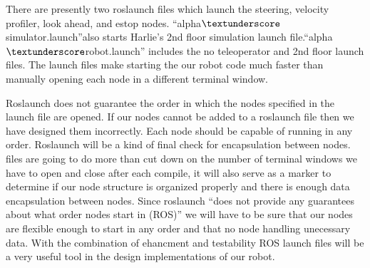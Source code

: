 There are presently two roslaunch files which launch the steering, velocity profiler, look ahead, and estop nodes. ``alpha$\textunderscore$simulator.launch''also starts Harlie's 2nd floor simulation launch file.``alpha$\textunderscore$robot.launch'' includes the no teleoperator and 2nd floor launch files. The launch files make starting the our robot code much faster than manually opening each node in a different terminal window.

Roslaunch does not guarantee the order in which the nodes specified in the launch file are opened.\cite{_roslaunch/architecture}  If our nodes cannot be added to a roslaunch file then we have designed them incorrectly. Each node should be capable of running in any order.  Roslaunch will be a kind of final check for encapsulation between nodes.  files are going to do more than cut down on the number of terminal windows we have to open and close after each compile, it will also serve as a marker to determine if our node structure is organized properly and there is enough data encapsulation between nodes. Since roslaunch ``does not provide any guarantees about what order nodes start in (ROS)'' we will have to be sure that our nodes are flexible enough to start in any order and that no node handling unecessary data. With the combination of ehancment and testability ROS launch files will be a very useful tool in the design implementations of our robot.
